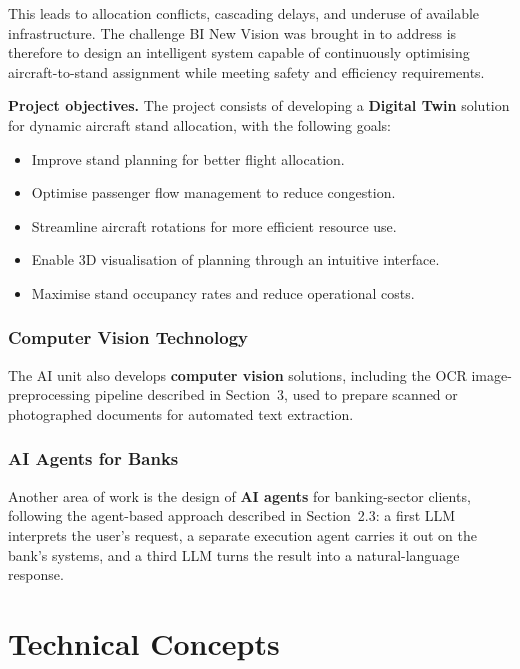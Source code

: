 \documentclass[12pt, a4paper]{article}
\begin{document}
This leads to allocation conflicts, cascading delays, and underuse of available infrastructure. The challenge BI New Vision was brought in to address is therefore to design an intelligent system capable of continuously optimising aircraft-to-stand assignment while meeting safety and efficiency requirements.

\textbf{Project objectives.} The project consists of developing a \textbf{Digital Twin} solution for dynamic aircraft stand allocation, with the following goals:

\begin{itemize}
  \item Improve stand planning for better flight allocation.
  \item Optimise passenger flow management to reduce congestion.
  \item Streamline aircraft rotations for more efficient resource use.
  \item Enable 3D visualisation of planning through an intuitive interface.
  \item Maximise stand occupancy rates and reduce operational costs.
\end{itemize}

\subsubsection*{Computer Vision Technology}

The AI unit also develops \textbf{computer vision} solutions, including the OCR image-preprocessing pipeline described in Section~3, used to prepare scanned or photographed documents for automated text extraction.

\subsubsection*{AI Agents for Banks}

Another area of work is the design of \textbf{AI agents} for banking-sector clients, following the agent-based approach described in Section~2.3: a first LLM interprets the user's request, a separate execution agent carries it out on the bank's systems, and a third LLM turns the result into a natural-language response.

\section{\color{navyblue} Technical Concepts}
\end{document}
